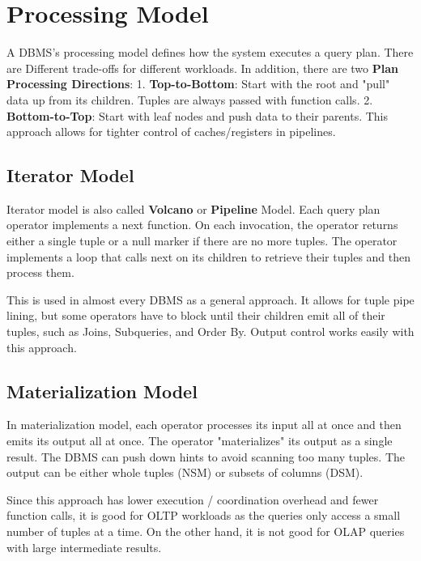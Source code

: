 \documentclass[11pt]{article}
\begin{document}
\section{Processing Model}
A DBMS's processing model defines how the system executes a query plan. There are Different trade-offs for different workloads. In addition, there are two \textbf{Plan Processing Directions}: 1. \textbf{Top-to-Bottom}: Start with the root and "pull" data up from its children. Tuples are always passed with function calls. 2. \textbf{Bottom-to-Top}: Start with leaf nodes and push data to their parents.
This approach allows for tighter control of caches/registers in pipelines.

\subsection*{Iterator Model}
Iterator model is also called \textbf{Volcano} or \textbf{Pipeline} Model. Each query plan operator implements a next function. On each invocation, the operator returns either a single tuple or a null marker if there are no more tuples. The operator implements a loop that calls next on its children to retrieve their tuples and then process them.

This is used in almost every DBMS as a general approach. It allows for tuple pipe lining, but some operators have to block until their children emit all of their tuples, such as Joins, Subqueries, and Order By. Output control works easily with this approach.

\subsection*{Materialization Model}
In materialization model, each operator processes its input all at once and
then emits its output all at once. The operator "materializes" its output as a single result. The DBMS can push down hints to avoid scanning too many tuples. The output can be either whole tuples (NSM) or subsets of columns (DSM). 

Since this approach has lower execution / coordination overhead and fewer function calls, it is good for OLTP workloads as the  queries only access a small number of tuples at a time. On the other hand, it is not good for OLAP queries with large
intermediate results.
\end{document}
